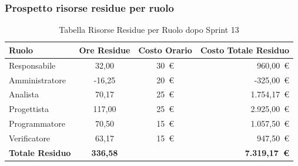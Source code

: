 \subsubsection{Prospetto risorse residue per ruolo}
\begin{table}[H]
    \centering
    \renewcommand{\arraystretch}{1.3}
    \begin{tabularx}{\textwidth}{|X|c|c|r|}
        \hline
        \textbf{Ruolo} & \textbf{Ore Residue} & \textbf{Costo Orario} &
        \textbf{Costo Totale Residuo} \\
        \hline
        Responsabile   & 32,00 & 30~\euro & 960{,}00~\euro \\
        Amministratore & -16,25 & 20~\euro &  -325{,}00~\euro \\
        Analista       & 70,17 & 25~\euro & 1.754{,}17~\euro \\
        Progettista    & 117,00 & 25~\euro & 2.925{,}00~\euro \\
        Programmatore  & 70,50 & 15~\euro & 1.057{,}50~\euro \\
        Verificatore   & 63,17 & 15~\euro & 947{,}50~\euro \\
        \hline
        \textbf{Totale Residuo} & \textbf{336,58} & &
        \textbf{7.319{,}17~\euro} \\
        \hline
    \end{tabularx}
    \caption{Tabella Risorse Residue per Ruolo dopo Sprint 13}
\end{table}

